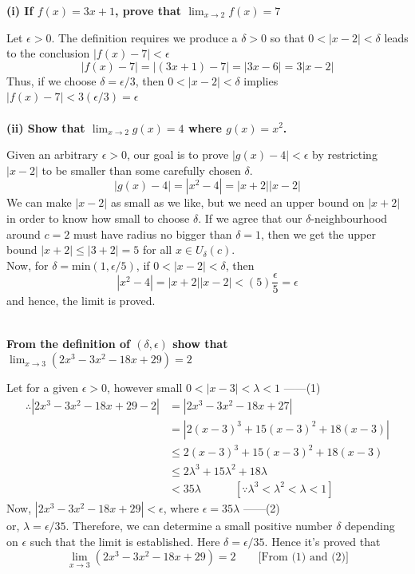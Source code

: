 \documentclass[12pt]{article}
\begin{document}
\begin{example}{\textbf{(i) If $f(x) = 3x+1$, prove that $ \lim_{x \to 2} f(x) = 7 $}}

    Let $\epsilon>0$. The definition requires we produce a $\delta>0$ so that $0<|x-2|<\delta$ leads to the conclusion $|f(x)-7|<\epsilon$ \[
        |f(x)-7| = |(3x+1)-7| = |3x-6| = 3|x-2|
    \]
    Thus, if we choose $\delta=\epsilon/3$, then $0<|x-2|<\delta$ implies $|f(x)-7|<3(\epsilon/3)=\epsilon$ \\~\\
    \textbf{(ii) Show that $\lim_{x \to 2} g(x) = 4$ where $g(x)=x^2$.}
    
    Given an arbitrary $\epsilon>0$, our goal is to prove $|g(x)-4|<\epsilon$ by restricting $| x-2 |$ to be smaller than some carefully chosen $\delta$. \\\[
        |g(x)-4| = |x^2-4| = |x+2||x-2|
    \] We can make $|x-2|$ as small as we like, but we need an upper bound on $|x+2|$ in order to know how small to choose $\delta$. If we agree that our $\delta$-neighbourhood around $c=2$ must have radius no bigger than $\delta=1$, then we get the upper bound $|x+2|\le |3+2|=5$ for all $x\in U_\delta(c)$. \\
    Now, for $\delta=\text{min}(1,\epsilon/5)$, if $0<|x-2|<\delta$, then \[
        |x^2-4| = |x+2||x-2| < (5)\frac{\epsilon}{5} = \epsilon
    \] and hence, the limit is proved. \\~\\
\end{example}

\begin{example}{\textbf{From the definition of $(\delta,\epsilon)$ show that $\lim_{x \to 3} (2x^3-3x^2-18x+29)=2$}}

    Let for a given $\epsilon>0$, however small $0<|x-3|<\lambda<1$ ------(1)
    \begin{align*}
        \therefore |2x^3-3x^2-18x+29 - 2| &= |2x^3-3x^2-18x+27| \\
        &= |2(x-3)^3 + 15(x-3)^2 + 18(x-3)| \\
        &\le 2(x-3)^3 + 15(x-3)^2 + 18(x-3) \\
        &\le 2\lambda^3 + 15\lambda^2 + 18\lambda \\
        &< 35\lambda \quad\quad\quad [ \because \lambda^3<\lambda^2<\lambda<1 ]
    \end{align*}
    Now, $|2x^3-3x^2-18x+29|<\epsilon$, where $\epsilon=35\lambda$ ------(2) \\
    or, $\lambda=\epsilon/35$. Therefore, we can determine a small positive number $\delta$ depending on $\epsilon$ such that the limit is established. Here $\delta=\epsilon/35$. Hence it's proved that \[
        \lim_{x \to 3} (2x^3-3x^2-18x+29) = 2 \quad\quad \text{[From (1) and (2)]}
    \]
\end{example}
\end{document}

